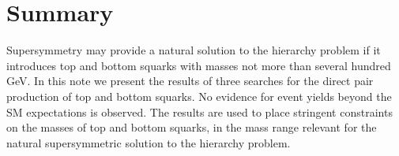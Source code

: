 \section{Summary}
\label{sec:summary}

Supersymmetry may provide a natural solution to the hierarchy problem if it introduces top and bottom squarks with masses not more than several hundred GeV.
In this note we present the results of three searches for the direct pair production of top and bottom squarks. No evidence for event yields beyond
the SM expectations is observed. The results are used to place stringent constraints on the masses of top and bottom squarks, in the mass range relevant
for the natural supersymmetric solution to the hierarchy problem.
